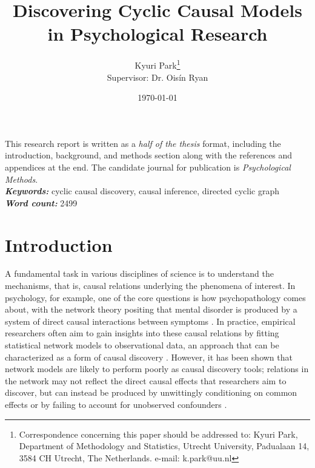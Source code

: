 \documentclass[11pt]{article}
\title{Discovering Cyclic Causal Models in Psychological Research 
}
\author[1]{\Large{Kyuri Park\thanks{Correspondence concerning this paper should be addressed to: Kyuri Park, Department of Methodology and Statistics, Utrecht University, Padualaan 14, 3584 CH Utrecht, The Netherlands. e-mail: \color{MidnightBlue}k.park@uu.nl}}\\
\large{Supervisor: Dr. Ois\'{i}n Ryan}}
\affil[1]{Department of Methodology and Statistics, Utrecht University}%
\date{\today}
\begin{document}
\maketitle
\thispagestyle{firstpage}

\begin{adjustwidth}{1.5cm}{1.5cm}
{
\noindent This research report is written as a \textit{half of the thesis} format, including the introduction, background, and methods section along with the references and appendices at the end. The candidate journal for publication is \textit{Psychological Methods}.\\
\noindent\textbf{\textit{Keywords: }}%
cyclic causal discovery, causal inference, directed cyclic graph\\
\noindent\textbf{\textit{Word count: }}%
2499}
\end{adjustwidth}



\section{Introduction}
A fundamental task in various disciplines of science is to understand the mechanisms, that is, causal relations underlying the phenomena of interest. In psychology, for example, one of the core questions is how psychopathology comes about, with the network theory positing that mental disorder is produced by a system of direct causal interactions between symptoms \citep{BorsboomCramer2013}. In practice, empirical researchers often aim to gain insights into these causal relations by fitting statistical network models to observational data, an approach that can be characterized as a form of causal discovery \citep{spirtes2000}. However, it has been shown that network models are likely to perform poorly as causal discovery tools; relations in the network may not reflect the direct causal effects that researchers aim to discover, but can instead be produced by unwittingly conditioning on common effects or by failing to account for unobserved confounders \citep{dablander2019node, Ryan2022}.
\end{document}
